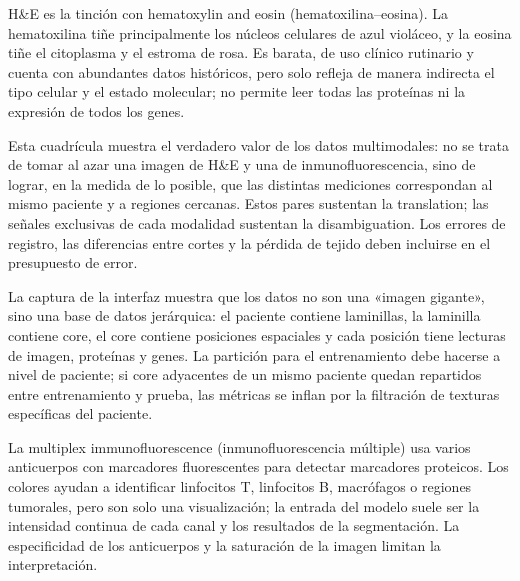 
H\&E es la tinción con hematoxylin and eosin (hematoxilina--eosina). La hematoxilina tiñe principalmente los núcleos celulares de azul violáceo, y la eosina tiñe el citoplasma y el estroma de rosa. Es barata, de uso clínico rutinario y cuenta con abundantes datos históricos, pero solo refleja de manera indirecta el tipo celular y el estado molecular; no permite leer todas las proteínas ni la expresión de todos los genes.


Esta cuadrícula muestra el verdadero valor de los datos multimodales: no se trata de tomar al azar una imagen de H\&E y una de inmunofluorescencia, sino de lograr, en la medida de lo posible, que las distintas mediciones correspondan al mismo paciente y a regiones cercanas. Estos pares sustentan la translation; las señales exclusivas de cada modalidad sustentan la disambiguation. Los errores de registro, las diferencias entre cortes y la pérdida de tejido deben incluirse en el presupuesto de error.


La captura de la interfaz muestra que los datos no son una «imagen gigante», sino una base de datos jerárquica: el paciente contiene laminillas, la laminilla contiene core, el core contiene posiciones espaciales y cada posición tiene lecturas de imagen, proteínas y genes. La partición para el entrenamiento debe hacerse a nivel de paciente; si core adyacentes de un mismo paciente quedan repartidos entre entrenamiento y prueba, las métricas se inflan por la filtración de texturas específicas del paciente.


La multiplex immunofluorescence (inmunofluorescencia múltiple) usa varios anticuerpos con marcadores fluorescentes para detectar marcadores proteicos. Los colores ayudan a identificar linfocitos T, linfocitos B, macrófagos o regiones tumorales, pero son solo una visualización; la entrada del modelo suele ser la intensidad continua de cada canal y los resultados de la segmentación. La especificidad de los anticuerpos y la saturación de la imagen limitan la interpretación.


